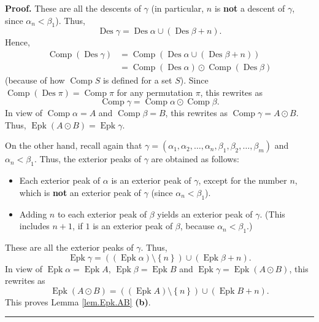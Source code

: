 \documentclass[numbers=enddot,12pt,final,onecolumn,notitlepage]{scrartcl}%
\theoremstyle{definition}
\newenvironment{proof}[1][Proof]{\noindent\textbf{#1.} }{\ \rule{0.5em}{0.5em}}
\begin{document}
\begin{proof}
These are all the descents of $\gamma$ (in particular, $n$ is \textbf{not} a
descent of $\gamma$, since $\alpha_{n}<\beta_{1}$). Thus,%
\[
\operatorname*{Des}\gamma=\operatorname*{Des}\alpha\cup\left(
\operatorname*{Des}\beta+n\right)  .
\]
Hence,%
\begin{align*}
\operatorname*{Comp}\left(  \operatorname*{Des}\gamma\right)   &
=\operatorname*{Comp}\left(  \operatorname*{Des}\alpha\cup\left(
\operatorname*{Des}\beta+n\right)  \right) \\
&  =\operatorname*{Comp}\left(  \operatorname*{Des}\alpha\right)
\odot\operatorname*{Comp}\left(  \operatorname*{Des}\beta\right)
\end{align*}
(because of how $\operatorname*{Comp}S$ is defined for a set $S$). Since
$\operatorname*{Comp}\left(  \operatorname*{Des}\pi\right)
=\operatorname*{Comp}\pi$ for any permutation $\pi$, this rewrites as%
\[
\operatorname*{Comp}\gamma=\operatorname*{Comp}\alpha\odot\operatorname*{Comp}%
\beta.
\]
In view of $\operatorname*{Comp}\alpha=A$ and $\operatorname*{Comp}\beta=B$,
this rewrites as $\operatorname*{Comp}\gamma=A\odot B$. Thus,
$\operatorname*{Epk}\left(  A\odot B\right)  =\operatorname*{Epk}\gamma$.

On the other hand, recall again that $\gamma=\left(  \alpha_{1},\alpha
_{2},\ldots,\alpha_{n},\beta_{1},\beta_{2},\ldots,\beta_{m}\right)  $ and
$\alpha_{n}<\beta_{1}$. Thus, the exterior peaks of $\gamma$ are obtained as follows:

\begin{itemize}
\item Each exterior peak of $\alpha$ is an exterior peak of $\gamma$, except
for the number $n$, which is \textbf{not} an exterior peak of $\gamma$ (since
$\alpha_{n}<\beta_{1}$).

\item Adding $n$ to each exterior peak of $\beta$ yields an exterior peak of
$\gamma$. (This includes $n+1$, if $1$ is an exterior peak of $\beta$, because
$\alpha_{n}<\beta_{1}$.)
\end{itemize}

These are all the exterior peaks of $\gamma$. Thus,%
\[
\operatorname*{Epk}\gamma=\left(  \left(  \operatorname*{Epk}\alpha\right)
\setminus\left\{  n\right\}  \right)  \cup\left(  \operatorname*{Epk}%
\beta+n\right)  .
\]
In view of $\operatorname*{Epk}\alpha=\operatorname*{Epk}A$,
$\operatorname*{Epk}\beta=\operatorname*{Epk}B$ and $\operatorname*{Epk}%
\gamma=\operatorname*{Epk}\left(  A\odot B\right)  $, this rewrites as
\[
\operatorname*{Epk}\left(  A\odot B\right)  =\left(  \left(
\operatorname*{Epk}A\right)  \setminus\left\{  n\right\}  \right)  \cup\left(
\operatorname*{Epk}B+n\right)  .
\]
This proves Lemma \ref{lem.Epk.AB} \textbf{(b)}.
\end{proof}
\end{document}

